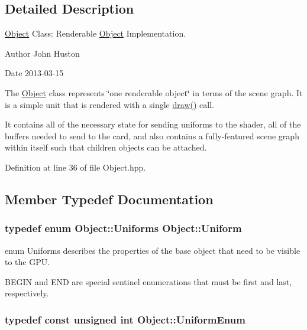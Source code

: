 \subsection{Detailed Description}
\hyperlink{class_object}{Object} Class\-: Renderable \hyperlink{class_object}{Object} Implementation. 

\begin{DoxyAuthor}{Author}
John Huston 
\end{DoxyAuthor}
\begin{DoxyDate}{Date}
2013-\/03-\/15
\end{DoxyDate}
The \hyperlink{class_object}{Object} class represents \char`\"{}one renderable object\char`\"{} in terms of the scene graph. It is a simple unit that is rendered with a single \hyperlink{class_object_a53e2ee7f548550be014126bed139fe69}{draw()} call.

It contains all of the necessary state for sending uniforms to the shader, all of the buffers needed to send to the card, and also contains a fully-\/featured scene graph within itself such that children objects can be attached. 

Definition at line 36 of file Object.\-hpp.



\subsection{Member Typedef Documentation}
\hypertarget{class_object_ae6a2969ddca87d2c54b7cb1c131a7d60}{
\subsubsection[{Uniform}]{\setlength{\rightskip}{0pt plus 5cm}typedef enum {\bf Object\-::\-Uniforms}  {\bf Object\-::\-Uniform}}}\label{class_object_ae6a2969ddca87d2c54b7cb1c131a7d60}


enum Uniforms describes the properties of the base object that need to be visible to the G\-P\-U. 

B\-E\-G\-I\-N and E\-N\-D are special sentinel enumerations that must be first and last, respectively. \hypertarget{class_object_a79b74057dbc5182b85c9c3ba8480fcf2}{
\subsubsection[{Uniform\-Enum}]{\setlength{\rightskip}{0pt plus 5cm}typedef const unsigned int {\bf Object\-::\-Uniform\-Enum}}}\label{class_object_a79b74057dbc5182b85c9c3ba8480fcf2}


